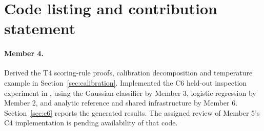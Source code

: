 \section{Code listing and contribution statement}
\label{sec:contrib}
\paragraph{Member 4.} Derived the T4 scoring-rule proofs, calibration decomposition and
temperature example in Section~\ref{sec:calibration}. Implemented the C6 held-out
inspection experiment in , using the Gaussian
classifier by Member 3, logistic regression by Member 2, and analytic reference and shared
infrastructure by Member 6. Section~\ref{sec:c6} reports the generated results.
The assigned review of Member 5's C4 implementation is pending availability of that code.
